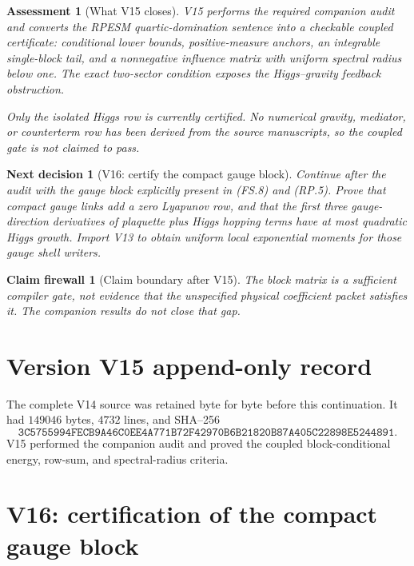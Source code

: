 \documentclass[11pt]{article}
\newtheorem{firewall}[theorem]{Claim firewall}
\newtheorem{decision}[theorem]{Next decision}
\newtheorem{assessment}[theorem]{Assessment}
\theoremstyle{remark}
\begin{document}
\begin{assessment}[What V15 closes]
\label{ass:v17v15-status}
V15 performs the required companion audit and converts the RPESM
quartic-domination sentence into a checkable coupled certificate:
conditional lower bounds, positive-measure anchors, an integrable
single-block tail, and a nonnegative influence matrix with uniform
spectral radius below one.  The exact two-sector condition exposes
the Higgs--gravity feedback obstruction.

Only the isolated Higgs row is currently certified.  No numerical
gravity, mediator, or counterterm row has been derived from the
source manuscripts, so the coupled gate is not claimed to pass.
\end{assessment}

\begin{decision}[V16: certify the compact gauge block]
\label{dec:v17v15-next}
Continue after the audit with the gauge block explicitly present in
\textup{(FS.8)} and \textup{(RP.5)}.  Prove that compact gauge links
add a zero Lyapunov row, and that the first three gauge-direction
derivatives of plaquette plus Higgs hopping terms have at most
quadratic Higgs growth.  Import V13 to obtain uniform local
exponential moments for those gauge shell writers.
\end{decision}

\begin{firewall}[Claim boundary after V15]
\label{fire:v17v15}
The block matrix is a sufficient compiler gate, not evidence that
the unspecified physical coefficient packet satisfies it.  The
companion results do not close that gap.
\end{firewall}

\section*{Version V15 append-only record}
The complete V14 source was retained byte for byte before this
continuation.  It had \(149046\) bytes, \(4732\) lines, and SHA--256
\[
 \texttt{3C5755994FECB9A46C0EE4A771B72F42970B6B21820B87A405C22898E5244891}.
\]
V15 performed the companion audit and proved the coupled
block-conditional energy, row-sum, and spectral-radius criteria.


\section{V16: certification of the compact gauge block}
\label{sec:v17v16}
\end{document}
